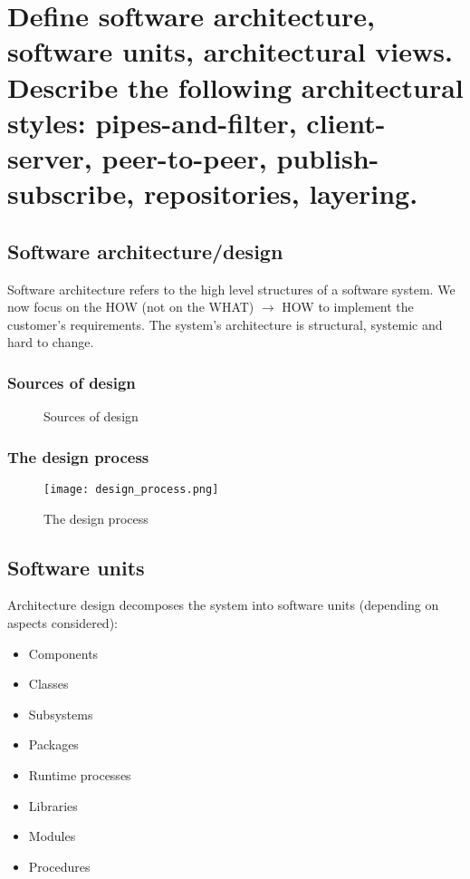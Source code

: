 \clearpage{}
\section{Define software architecture, software units, architectural views.
Describe the following architectural styles: pipes-and-filter,
client-server, peer-to-peer, publish-subscribe, repositories, layering.}

\subsection{Software architecture/design}

Software architecture refers to the high level structures of a software system.
We now focus on the HOW (not on the WHAT) $\rightarrow$ HOW to implement the
customer's requirements. The system's architecture is structural, systemic and 
hard to change.

\subsubsection{Sources of design}

\begin{figure}[!ht]
    \centering
    
    \caption{Sources of design}
\end{figure}

\subsubsection{The design process}

\begin{figure}[!ht]
    \centering
    \texttt{[image: design\_process.png]}
    \caption{The design process}
\end{figure}

\subsection{Software units}

Architecture design decomposes the system into software units (depending on
aspects considered):

\begin{itemize}
    \item Components
    \item Classes
    \item Subsystems
    \item Packages
    \item Runtime processes
    \item Libraries
    \item Modules
    \item Procedures
\end{itemize}

